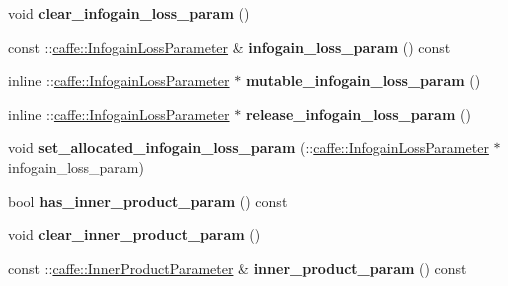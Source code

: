 \begin{DoxyCompactItemize}
void {\bfseries clear\+\_\+infogain\+\_\+loss\+\_\+param} ()
\item 
\mbox{\label{classcaffe_1_1_v1_layer_parameter_ad350804b67a4cdc23d24325cc23f8b05}} 
const \+::\mbox{\hyperlink{classcaffe_1_1_infogain_loss_parameter}{caffe\+::\+Infogain\+Loss\+Parameter}} \& {\bfseries infogain\+\_\+loss\+\_\+param} () const
\item 
\mbox{\label{classcaffe_1_1_v1_layer_parameter_a1ef069af49b9266daf007a9744bb5213}} 
inline \+::\mbox{\hyperlink{classcaffe_1_1_infogain_loss_parameter}{caffe\+::\+Infogain\+Loss\+Parameter}} $\ast$ {\bfseries mutable\+\_\+infogain\+\_\+loss\+\_\+param} ()
\item 
\mbox{\label{classcaffe_1_1_v1_layer_parameter_a8b5d35f52d4ba1680fbd358e42697e9b}} 
inline \+::\mbox{\hyperlink{classcaffe_1_1_infogain_loss_parameter}{caffe\+::\+Infogain\+Loss\+Parameter}} $\ast$ {\bfseries release\+\_\+infogain\+\_\+loss\+\_\+param} ()
\item 
\mbox{\label{classcaffe_1_1_v1_layer_parameter_aae9faaacd77f11400f9e679c26b45770}} 
void {\bfseries set\+\_\+allocated\+\_\+infogain\+\_\+loss\+\_\+param} (\+::\mbox{\hyperlink{classcaffe_1_1_infogain_loss_parameter}{caffe\+::\+Infogain\+Loss\+Parameter}} $\ast$infogain\+\_\+loss\+\_\+param)
\item 
\mbox{\label{classcaffe_1_1_v1_layer_parameter_ad2ef494ac58bfb9c252d4fceaf4ef51c}} 
bool {\bfseries has\+\_\+inner\+\_\+product\+\_\+param} () const
\item 
\mbox{\label{classcaffe_1_1_v1_layer_parameter_abf89b78d25e3804d89f4fee1c3cc8b28}} 
void {\bfseries clear\+\_\+inner\+\_\+product\+\_\+param} ()
\item 
\mbox{\label{classcaffe_1_1_v1_layer_parameter_a03ec4b3e7a1ffcbe15b478f6ee90e8be}} 
const \+::\mbox{\hyperlink{classcaffe_1_1_inner_product_parameter}{caffe\+::\+Inner\+Product\+Parameter}} \& {\bfseries inner\+\_\+product\+\_\+param} () const
\item 
\mbox{\label{classcaffe_1_1_v1_layer_parameter_a7bdd6bb0ed6f74f467287581def076a5}} 

\end{DoxyCompactItemize}
